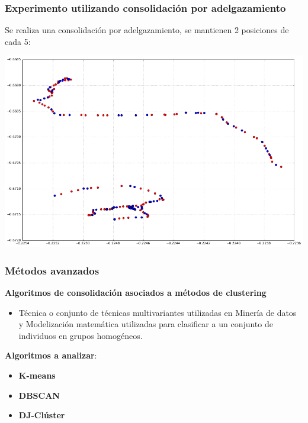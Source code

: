 \documentclass[10pt, spanish]{beamer}
\begin{document}
\begin{frame}[fragile]
\frametitle{Experimento utilizando consolidaci\'on por adelgazamiento}
Se realiza una consolidaci\'on por adelgazamiento, se mantienen 2 posiciones de cada 5:\\

\bigskip

\begin{center}
	\includegraphics[scale=.3]{thinningSuj1.png}
\end{center}

\end{frame}



\begin{frame}[fragile]
\frametitle{M\'etodos avanzados}

\textbf{Algoritmos de consolidaci\'on asociados a m\'etodos de clustering}\\

\begin{itemize}
   \item T\'ecnica o conjunto de t\'ecnicas multivariantes utilizadas en Miner\'ia de datos y Modelizaci\'on matem\'atica utilizadas para clasificar a un conjunto de individuos en grupos homog\'eneos.
\end{itemize}

\textbf{Algoritmos a analizar}:\\
\begin{itemize}
\item \textbf{K-means}
\item \textbf{DBSCAN}
\item \textbf{DJ-Cl\'uster}
\end{itemize}

\end{frame}
\end{document}
